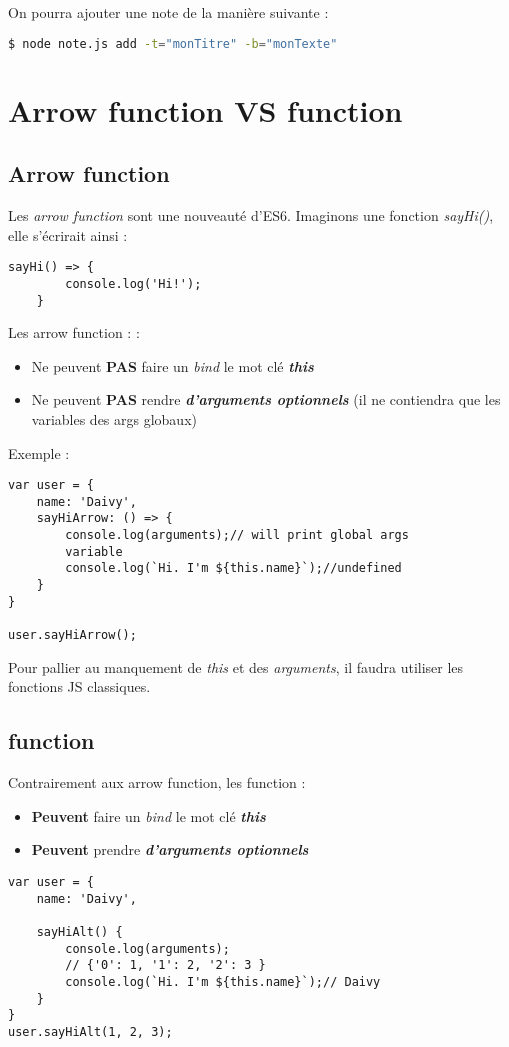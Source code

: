 \documentclass[a4paper,10pt]{article}
\begin{document}
On pourra ajouter une note de la manière suivante :
\begin{lstlisting}[language=bash,frame=single]
    $ node note.js add -t="monTitre" -b="monTexte" 
\end{lstlisting}

\section{Arrow function VS function}
\subsection{Arrow function}
Les \emph{arrow function} sont une nouveauté d'ES6. Imaginons une fonction \emph{sayHi()}, elle s'écrirait ainsi :

\begin{lstlisting}[frame=single]
    sayHi() => {
        console.log('Hi!');
    }  
\end{lstlisting}
Les arrow function :  :
\begin{itemize}
    \item Ne peuvent \textbf{PAS} faire un \emph{bind}  le mot clé \textbf{\emph{this}} 
    \item Ne peuvent \textbf{PAS} rendre \textbf{\emph{d'arguments optionnels}} (il ne contiendra que les variables des args globaux)
\end{itemize}
Exemple : 
\begin{lstlisting}[frame=single]
var user = {
    name: 'Daivy',
    sayHiArrow: () => { 
        console.log(arguments);// will print global args 
        variable
        console.log(`Hi. I'm ${this.name}`);//undefined
    }
}

user.sayHiArrow();
\end{lstlisting}
Pour pallier au manquement de \emph{this} et des \emph{arguments}, il faudra utiliser les fonctions JS classiques.

\subsection{function}
Contrairement aux arrow function, les function :
\begin{itemize}
    \item \textbf{Peuvent} faire un \emph{bind}  le mot clé \textbf{\emph{this}} 
    \item \textbf{Peuvent} prendre \textbf{\emph{d'arguments optionnels}}
\end{itemize}
\begin{lstlisting}[frame=single]
    var user = {
    name: 'Daivy',
  
    sayHiAlt() { 
        console.log(arguments);
        // {'0': 1, '1': 2, '2': 3 }
        console.log(`Hi. I'm ${this.name}`);// Daivy
    }
}
user.sayHiAlt(1, 2, 3);
\end{lstlisting}
\end{document}
